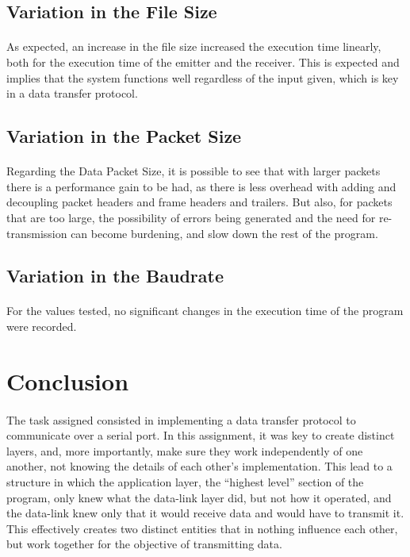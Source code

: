 \documentclass[11pt]{article}
\begin{document}
\subsection*{Variation in the File Size}

\paragraph{}As expected, an increase in the file size increased the execution time linearly, both for the
execution time of the emitter and the receiver. This is expected and implies that the system functions
well regardless of the input given, which is key in a data transfer protocol.

\subsection*{Variation in the Packet Size}

\paragraph{}Regarding the Data Packet Size, it is possible to see that with larger packets there is a
performance gain to be had, as there is less overhead with adding and decoupling packet headers and frame
headers and trailers. But also, for packets that are too large, the possibility of errors being generated
and the need for re-transmission can become burdening, and slow down the rest of the program.

\subsection*{Variation in the Baudrate}

\paragraph{}For the values tested, no significant changes in the execution time of the program were recorded.

\section{Conclusion}

\paragraph{}The task assigned consisted in implementing a data transfer protocol to communicate over a serial
port. In this assignment, it was key to create distinct layers, and, more importantly, make sure they work independently of one another, not knowing the details of each other's implementation. This lead to a structure in which the application layer, the ``highest level''
section of the program, only knew what the data-link layer did, but not how it operated, and the data-link
knew only that it would receive data and would have to transmit it. This effectively creates two distinct
entities that in nothing influence each other, but work together for the objective of transmitting data.
\end{document}
